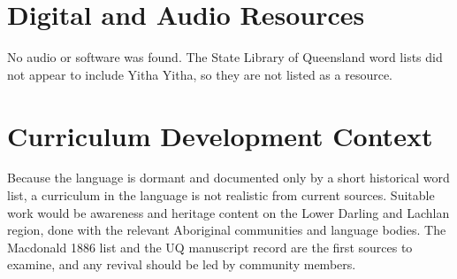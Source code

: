 \documentclass[12pt]{article}
\begin{document}
\section{Digital and Audio Resources}
No audio or software was found. The State Library of Queensland word lists did not appear to include Yitha Yitha, so they are not listed as a resource.

\section{Curriculum Development Context}
Because the language is dormant and documented only by a short historical word list, a curriculum in the language is not realistic from current sources. Suitable work would be awareness and heritage content on the Lower Darling and Lachlan region, done with the relevant Aboriginal communities and language bodies. The Macdonald 1886 list and the UQ manuscript record are the first sources to examine, and any revival should be led by community members.
\end{document}
